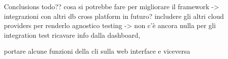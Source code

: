 \begin{chapter}{Conclusions}
    todo??
    cosa si potrebbe fare per migliorare il framework -> integrazioni
    con altri db
    cross platform in futuro? includere gli altri cloud providers
    per renderlo agnostico
    testing -> non c'è ancora nulla per gli integration test
    ricavare info dalla dashboard,

    portare alcune funzioni della cli sulla web interface e viceversa
\end{chapter}